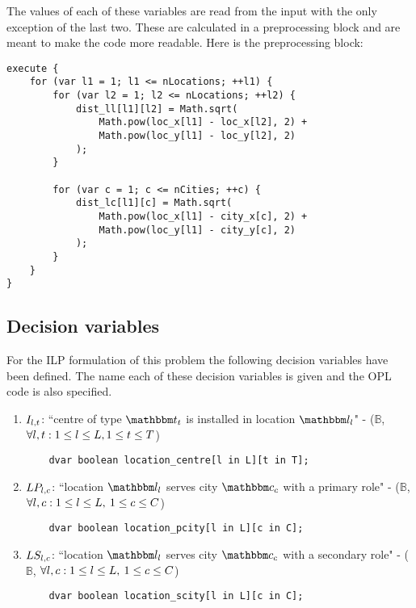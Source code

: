 The values of each of these variables are read from the input with the only exception of the last two.
These are calculated in a preprocessing block and are meant to make the code more readable. Here is the
preprocessing block:

\begin{lstlisting}
execute {
	for (var l1 = 1; l1 <= nLocations; ++l1) {
		for (var l2 = 1; l2 <= nLocations; ++l2) {
			dist_ll[l1][l2] = Math.sqrt(
			    Math.pow(loc_x[l1] - loc_x[l2], 2) +
			    Math.pow(loc_y[l1] - loc_y[l2], 2)
            );
		}
		
		for (var c = 1; c <= nCities; ++c) {
			dist_lc[l1][c] = Math.sqrt(
			    Math.pow(loc_x[l1] - city_x[c], 2) +
			    Math.pow(loc_y[l1] - city_y[c], 2)
            );
		}
	}
}
\end{lstlisting}

\subsection{Decision variables}
\label{sec:ILP-form:dec-var}

For the ILP formulation of this problem the following decision variables have been defined. The name
each of these decision variables is given and the OPL code is also specified.

\begin{enumerate}
    \item $I_{l, t}$: ``centre of type $\ecentre_\icentre$ is installed in location
    $\eloc_\iloc$" -
    ($\mathbb{B}$, $\forall l, t: 1 \le l \le L, 1 \le t \le T$)
    \label{dec-var:centre-installed}
        
    \begin{lstlisting}
    dvar boolean location_centre[l in L][t in T];
    \end{lstlisting}
    
    \item $LP_{l, c}$: ``location $\eloc_\iloc$ serves city $\ecity_\icity$ with a primary
    role" - ($\mathbb{B}$, $\forall l, c: 1 \le l \le L,\:
    1 \le c \le C$)
    \label{dec-var:location-primary-centre}
    
    \begin{lstlisting}
    dvar boolean location_pcity[l in L][c in C];
    \end{lstlisting}

    \item $LS_{l, c}$: ``location $\eloc_\iloc$ serves city $\ecity_\icity$ with a secondary
    role" - ($\mathbb{B}$, $\forall l, c: 1 \le l \le L,\:
    1 \le c \le C$)
    \label{dec-var:location-secondary-centre}
    
    \begin{lstlisting}
    dvar boolean location_scity[l in L][c in C];
    \end{lstlisting}
    
\end{enumerate}

